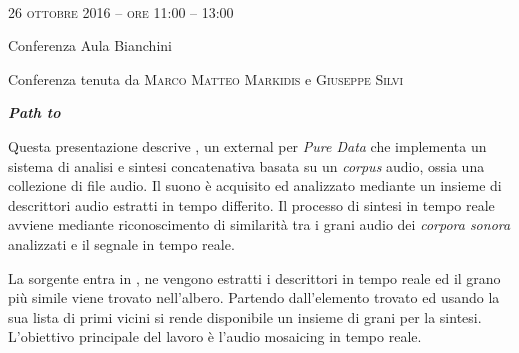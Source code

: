 
\begin{flushleft}

~\vfill

\large{
	\scshape{
	26 ottobre 2016 -- ore 11:00 -- 13:00
	}}

\medskip
	
\small{Conferenza
	\newline Aula Bianchini}

\medskip

{\fontsize{42}{42} }

\normalfont

\normalsize

\bigskip

Conferenza tenuta da \textsc{Marco Matteo Markidis} e \textsc{Giuseppe Silvi}

\bigskip

\textbf{\emph{Path to \pa}}

Questa presentazione descrive \pa, %
un external per \emph{Pure Data} che implementa un sistema di analisi e sintesi concatenativa basata su un \emph{corpus} audio, ossia una collezione di file audio. %
Il suono \`e acquisito %
ed analizzato mediante un insieme di descrittori audio estratti in tempo differito. Il processo di sintesi in tempo reale avviene mediante riconoscimento di similarit\`a tra i grani audio dei \emph{corpora sonora} analizzati e il segnale in tempo reale.


La sorgente entra in \pa, ne vengono estratti i descrittori in tempo reale ed il grano pi\`u simile viene trovato nell'albero. Partendo dall'elemento trovato ed usando la sua lista di primi vicini si rende disponibile un insieme di grani per la sintesi. L'obiettivo principale del lavoro \`e l'audio mosaicing in tempo reale. 


\end{flushleft}
